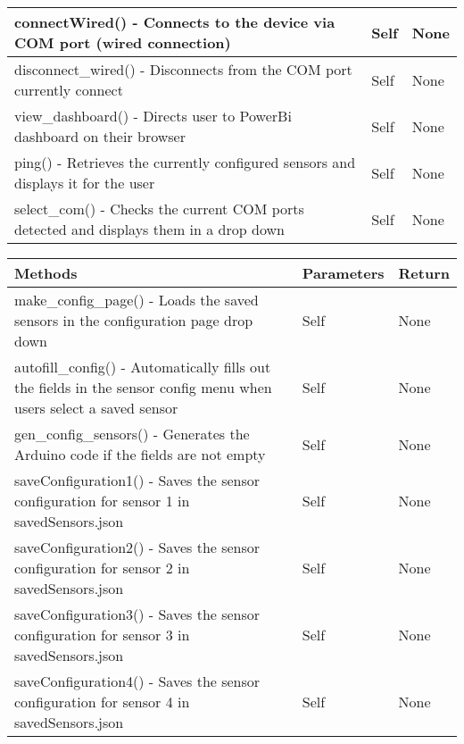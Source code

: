 \documentclass[12pt, titlepage]{article}
\begin{document}
\begin{tabular}{| p{} | p{}| p{}|}
        \hline
        connectWired() - Connects to the device via COM port (wired connection) & Self & None\\
        \hline
        disconnect\_wired() - Disconnects from the COM port currently connect & Self & None\\
        \hline
        view\_dashboard() - Directs user to PowerBi dashboard on their browser & Self & None\\
        \hline
        ping() - Retrieves the currently configured sensors and displays it for the user & Self & None\\
        \hline
        select\_com() - Checks the current COM ports detected and displays them in a drop down & Self & None\\
        \hline
      \end{tabular}


      \noindent \begin{tabular}{| p{} | p{}| p{}|}
        \hline
        \rowcolor[gray]{0.9}
        Methods & Parameters & Return\\
        \hline
        make\_config\_page() - Loads the saved sensors in the configuration page drop down & Self & None\\
        \hline
        autofill\_config() - Automatically fills out the fields in the sensor config menu when users select a saved sensor & Self & None\\
        \hline
        gen\_config\_sensors() - Generates the Arduino code if the fields are not empty & Self & None\\
        \hline
        saveConfiguration1() - Saves the sensor configuration for sensor 1 in savedSensors.json & Self & None\\
        \hline
        saveConfiguration2() - Saves the sensor configuration for sensor 2 in savedSensors.json & Self & None\\
        \hline
        saveConfiguration3() - Saves the sensor configuration for sensor 3 in savedSensors.json & Self & None\\
        \hline
        saveConfiguration4() - Saves the sensor configuration for sensor 4 in savedSensors.json & Self & None\\
        \hline
      \end{tabular}
\end{document}
